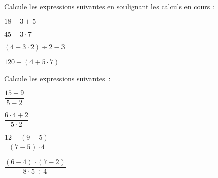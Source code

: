\begin{methode*1}
 
 \exercice 
Calcule les expressions suivantes en soulignant les calculs en cours :
\begin{colenumerate}{2}
 \item $18 - 3 + 5$
 \item $45 - 3 \cdot 7$
 \item $(4 + 3 \cdot 2) \div 2 - 3$
 \item $120 - (4 + 5 \cdot 7)$
 \end{colenumerate}


 \exercice 
Calcule les expressions suivantes :
\begin{colenumerate}{4}
\item $\dfrac{15 +9}{5 - 2}$
\item $\dfrac{6 \cdot 4 + 2}{5 \cdot 2}$
\item $\dfrac{12 - (9 - 5)}{(7- 5) \cdot 4}$
\item $\dfrac{(6 - 4) \cdot (7 - 2)}{8 \cdot 5 \div 4}$
 \end{colenumerate}


\end{methode*1}
